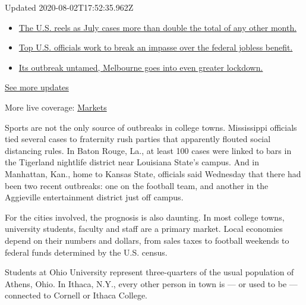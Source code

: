 Updated 2020-08-02T17:52:35.962Z

\begin{itemize}
\tightlist
\item
  \href{https://www.nytimes.com/2020/08/01/world/coronavirus-covid-19.html?action=click\&pgtype=Article\&state=default\&region=MAIN_CONTENT_1\&context=storylines_live_updates\#link-34047410}{The
  U.S. reels as July cases more than double the total of any other
  month.}
\item
  \href{https://www.nytimes.com/2020/08/01/world/coronavirus-covid-19.html?action=click\&pgtype=Article\&state=default\&region=MAIN_CONTENT_1\&context=storylines_live_updates\#link-780ec966}{Top
  U.S. officials work to break an impasse over the federal jobless
  benefit.}
\item
  \href{https://www.nytimes.com/2020/08/01/world/coronavirus-covid-19.html?action=click\&pgtype=Article\&state=default\&region=MAIN_CONTENT_1\&context=storylines_live_updates\#link-2bc8948}{Its
  outbreak untamed, Melbourne goes into even greater lockdown.}
\end{itemize}

\href{https://www.nytimes.com/2020/08/01/world/coronavirus-covid-19.html?action=click\&pgtype=Article\&state=default\&region=MAIN_CONTENT_1\&context=storylines_live_updates}{See
more updates}

More live coverage:
\href{https://www.nytimes.com/live/2020/07/31/business/stock-market-today-coronavirus?action=click\&pgtype=Article\&state=default\&region=MAIN_CONTENT_1\&context=storylines_live_updates}{Markets}

Sports are not the only source of outbreaks in college towns.
Mississippi officials tied several cases to fraternity rush parties that
apparently flouted social distancing rules. In Baton Rouge, La., at
least 100 cases were linked to bars in the Tigerland nightlife district
near Louisiana State's campus. And in Manhattan, Kan., home to Kansas
State, officials said Wednesday that there had been two recent
outbreaks: one on the football team, and another in the Aggieville
entertainment district just off campus.

For the cities involved, the prognosis is also daunting. In most college
towns, university students, faculty and staff are a primary market.
Local economies depend on their numbers and dollars, from sales taxes to
football weekends to federal funds determined by the U.S. census.

Students at Ohio University represent three-quarters of the usual
population of Athens, Ohio. In Ithaca, N.Y., every other person in town
is --- or used to be --- connected to Cornell or Ithaca College.

